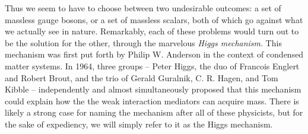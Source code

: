 Thus we seem to have to choose between two undesirable outcomes: a set of massless gauge bosons, or a set of massless scalars, both of which go against what we actually see in nature. Remarkably, each of these problems would turn out to be the solution for the other, through the marvelous \emph{Higgs mechanism}. This mechanism was first put forth by Philip W. Anderson in the context of condensed matter systems. In 1964, three groups -- Peter Higgs, the duo of Francois Englert and Robert Brout, and the trio of Gerald Guralnik, C. R. Hagen, and Tom Kibble -- independently and almost simultaneously proposed that this mechanism could explain how the the weak interaction mediators can acquire mass. There is likely a strong case for naming the mechanism after all of these physicists, but for the sake of expediency, we will simply refer to it as the Higgs mechanism.

